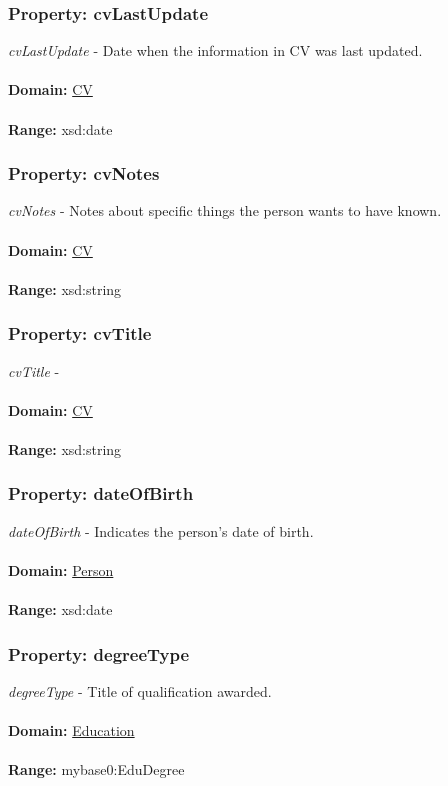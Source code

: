 \documentclass[a4paper,12pt]{article}
\numberwithin{equation}{section}
\begin{document}
\subsubsection{Property: cvLastUpdate}\hypertarget{cvLastUpdate}{}
\textit{cvLastUpdate} - Date when the information in CV was last updated.
\\\\
\textbf{Domain:} \hyperlink{CV}{CV} 
\\\\
\textbf{Range:}  xsd:date

\subsubsection{Property: cvNotes}\hypertarget{cvNotes}{}
\textit{cvNotes} - Notes about specific things the person wants to have known.
\\\\
\textbf{Domain:} \hyperlink{CV}{CV} 
\\\\
\textbf{Range:}  xsd:string

\subsubsection{Property: cvTitle}\hypertarget{cvTitle}{}
\textit{cvTitle} -
\\\\
\textbf{Domain:} \hyperlink{CV}{CV} 
\\\\
\textbf{Range:}  xsd:string

\subsubsection{Property: dateOfBirth}\hypertarget{dateOfBirth}{}
\textit{dateOfBirth} - Indicates the person's date of birth.
\\\\
\textbf{Domain:} \hyperlink{Person}{Person} 
\\\\
\textbf{Range:}  xsd:date

\subsubsection{Property: degreeType}\hypertarget{degreeType}{}
\textit{degreeType} - Title of qualification awarded.
\\\\
\textbf{Domain:} \hyperlink{Education}{Education} 
\\\\
\textbf{Range:}  mybase0:EduDegree
\end{document}
